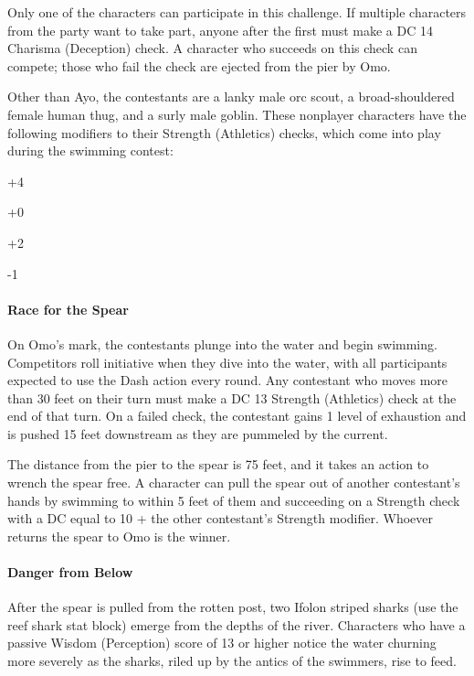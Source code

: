 \documentclass[10pt,a4paper,twoside,twocolumn,openany,nodeprecatedcode]{dndbook}
\begin{document}
Only one of the characters can participate in this challenge. If multiple characters from the party want to take part, anyone after the first must make a DC 14 Charisma (Deception) check. A character who succeeds on this check can compete; those who fail the check are ejected from the pier by Omo.

Other than Ayo, the contestants are a lanky male orc scout, a broad-shouldered female human thug, and a surly male goblin. These nonplayer characters have the following modifiers to their Strength (Athletics) checks, which come into play during the swimming contest:


\begin{description}[nolistsep]
\item[Ayo Jabe:]
+4
\item[Male Orc:]
+0
\item[Female Human:]
+2
\item[Male Goblin:]
-1
\end{description}

\paragraph{Race for the Spear}
On Omo's mark, the contestants plunge into the water and begin swimming. Competitors roll initiative when they dive into the water, with all participants expected to use the Dash action every round. Any contestant who moves more than 30 feet on their turn must make a DC 13 Strength (Athletics) check at the end of that turn. On a failed check, the contestant gains 1 level of exhaustion and is pushed 15 feet downstream as they are pummeled by the current.

The distance from the pier to the spear is 75 feet, and it takes an action to wrench the spear free. A character can pull the spear out of another contestant's hands by swimming to within 5 feet of them and succeeding on a Strength check with a DC equal to 10 + the other contestant's Strength modifier. Whoever returns the spear to Omo is the winner.

\paragraph{Danger from Below}
After the spear is pulled from the rotten post, two Ifolon striped sharks (use the reef shark stat block) emerge from the depths of the river. Characters who have a passive Wisdom (Perception) score of 13 or higher notice the water churning more severely as the sharks, riled up by the antics of the swimmers, rise to feed.
\end{document}
